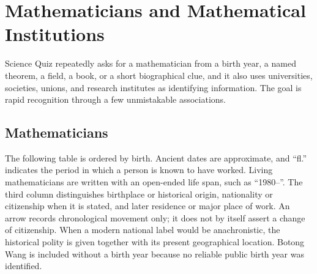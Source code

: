     \chapter{Mathematicians and Mathematical Institutions}

    Science Quiz repeatedly asks for a mathematician from a birth year, a named
    theorem, a field, a book, or a short biographical clue, and it also uses
    universities, societies, unions, and research institutes as identifying
    information. The goal is rapid recognition through a few unmistakable
    associations.

    \section*{Mathematicians}

    The following table is ordered by birth. Ancient dates are approximate, and
    ``fl.'' indicates the period in which a person is known to have worked.
    Living mathematicians are written with an open-ended life span, such as
    ``1980--''. The third column distinguishes birthplace or historical origin,
    nationality or citizenship when it is stated, and later residence or major
    place of work. An arrow records chronological movement only; it does not by
    itself assert a change of citizenship. When a modern national label would
    be anachronistic, the historical polity is given together with its present
    geographical location. Botong Wang is included without a birth year because
    no reliable public birth year was identified.

    \vspace{1em}

